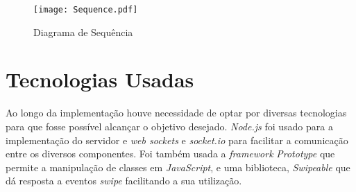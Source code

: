 \begin{figure}[ht]
\centering
\texttt{[image: Sequence.pdf]}
\caption[Diagrama de Sequência] {Diagrama de Sequência}
\label{fig:sequencia}
\end{figure}

\pagebreak


\section{Tecnologias Usadas} \label{sec:tec}

Ao longo da implementação houve necessidade de optar por diversas tecnologias para que fosse possível alcançar o objetivo desejado. \textit{Node.js} foi usado para a implementação do servidor e \textit{web sockets} e \textit{socket.io} para facilitar a comunicação entre os diversos componentes. Foi também usada a \textit{framework} \textit{Prototype} que permite a manipulação de classes em \textit{JavaScript}, e uma biblioteca, \textit{Swipeable} que dá resposta a eventos \textit{swipe} facilitando a sua utilização.

